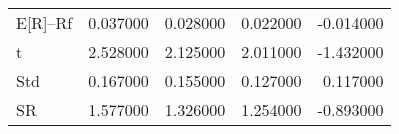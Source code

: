 \begin{tabular}{lrrrr}
\toprule
\midrule
E[R]--Rf & 0.037000 & 0.028000 & 0.022000 & -0.014000 \\
t & 2.528000 & 2.125000 & 2.011000 & -1.432000 \\
Std & 0.167000 & 0.155000 & 0.127000 & 0.117000 \\
SR & 1.577000 & 1.326000 & 1.254000 & -0.893000 \\
\bottomrule
\end{tabular}
